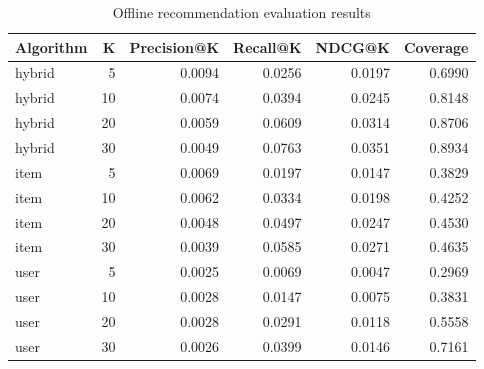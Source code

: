﻿\begin{table}[htbp]
\centering
\caption{Offline recommendation evaluation results}
\begin{tabular}{lrrrrr}
\hline
Algorithm & K & Precision@K & Recall@K & NDCG@K & Coverage \\
\hline
hybrid & 5 & 0.0094 & 0.0256 & 0.0197 & 0.6990 \\
hybrid & 10 & 0.0074 & 0.0394 & 0.0245 & 0.8148 \\
hybrid & 20 & 0.0059 & 0.0609 & 0.0314 & 0.8706 \\
hybrid & 30 & 0.0049 & 0.0763 & 0.0351 & 0.8934 \\
item & 5 & 0.0069 & 0.0197 & 0.0147 & 0.3829 \\
item & 10 & 0.0062 & 0.0334 & 0.0198 & 0.4252 \\
item & 20 & 0.0048 & 0.0497 & 0.0247 & 0.4530 \\
item & 30 & 0.0039 & 0.0585 & 0.0271 & 0.4635 \\
user & 5 & 0.0025 & 0.0069 & 0.0047 & 0.2969 \\
user & 10 & 0.0028 & 0.0147 & 0.0075 & 0.3831 \\
user & 20 & 0.0028 & 0.0291 & 0.0118 & 0.5558 \\
user & 30 & 0.0026 & 0.0399 & 0.0146 & 0.7161 \\
\hline
\end{tabular}
\end{table}
